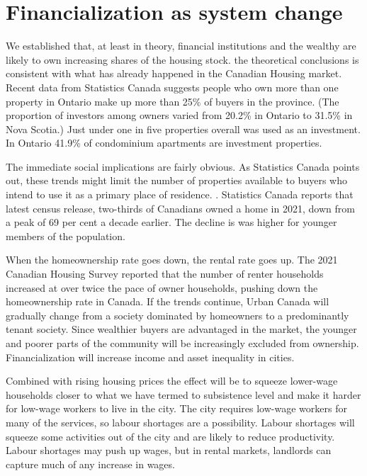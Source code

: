 \section{Financialization as system change}\label{section-system}
We established that, at least in theory,  financial institutions and the wealthy are likely to own increasing shares of the housing stock. the theoretical conclusions is consistent with what has already happened in the Canadian Housing market. Recent data from Statistics Canada \cite{fontaineResidentialRealEstate2023} suggests people who own more than one property in Ontario make up more than 25\% of buyers in the province. (The proportion of investors among owners varied from 20.2\% in Ontario to 31.5\% in Nova Scotia.)
Just under one in five properties overall was used as an investment.
In Ontario 41.9\% of condominium apartments are investment properties.\cite{statisticscanadaBuyRentHousing2022}

The immediate social implications are fairly obvious. As Statistics Canada points out, these trends might limit the number of properties available to buyers who intend to use it as a primary place of residence. \cite{fontaineResidentialRealEstate2023}. Statistics Canada reports that latest census release, two-thirds of Canadians owned a home in 2021, down from a peak of 69 per cent a decade earlier. The decline is was higher for younger members of the population. 

When the homeownership rate goes down, the rental rate goes up. The 2021 Canadian Housing Survey reported that the number of renter households increased  at over twice the pace of owner households, pushing down the homeownership rate in Canada. If the trends continue, Urban Canada will gradually change from a society dominated by homeowners to a predominantly tenant society. Since wealthier buyers are advantaged in the market, the younger and poorer parts of the community will be increasingly excluded from ownership. Financialization will increase income and asset inequality in cities.

Combined with rising housing prices the effect will be to squeeze lower-wage households closer to what we have termed to subsistence level and make it harder for low-wage workers to live in the city. The city requires low-wage workers for many of the services, so labour shortages are a possibility. Labour shortages will squeeze some activities out of the city and are likely to reduce productivity. Labour shortages may push up wages, but in rental markets, landlords can capture much of any increase in wages. 

